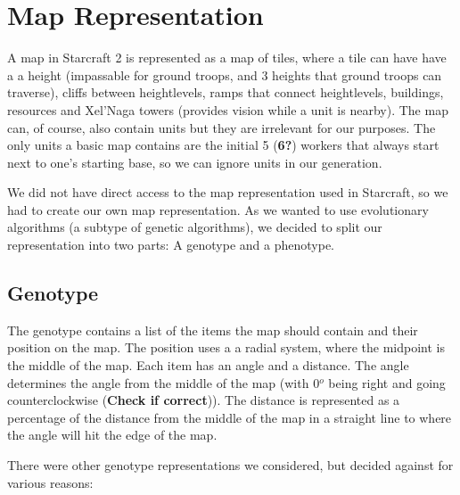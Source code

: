 \section{Map Representation}
\label{MapRepresentation}

A map in Starcraft 2 is represented as a map of tiles, where a tile can have have a a height (impassable for ground troops, and 3 heights that ground troops can traverse), cliffs between heightlevels, ramps that connect heightlevels, buildings, resources and Xel'Naga towers (provides vision while a unit is nearby). The map can, of course, also contain units but they are irrelevant for our purposes. The only units a basic map contains are the initial 5 (\textbf{6?}) workers that always start next to one's starting base, so we can ignore units in our generation.

We did not have direct access to the map representation used in Starcraft, so we had to create our own map representation. As we wanted to use evolutionary algorithms (a subtype of genetic algorithms), we decided to split our representation into two parts: A genotype and a phenotype.

\subsection{Genotype}
\label{MapRepresentation_Genotype}

The genotype contains a list of the items the map should contain and their position on the map. The position uses a a radial system, where the midpoint is the middle of the map. Each item has an angle and a distance. The angle determines the angle from the middle of the map (with 0$^o$ being right and going counterclockwise (\textbf{Check if correct})). The distance is represented as a percentage of the distance from the middle of the map in a straight line to where the angle will hit the edge of the map.

There were other genotype representations we considered, but decided against for various reasons:

